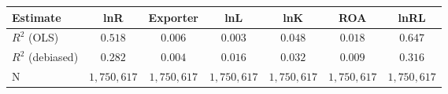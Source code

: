 \begin{tabular}{l*{6}{c}}
\hline\hline
 Estimate & lnR & Exporter & lnL & lnK & ROA & lnRL \\
\hline
\addlinespace $ R^2$ (OLS) & $0.518$ & $0.006$ & $0.003$ & $0.048$ & $0.018$ & $0.647$ \\
$ R^2$ (debiased) & $0.282$ & $0.004$ & $0.016$ & $0.032$ & $0.009$ & $0.316$ \\
N & $1,750,617$ & $1,750,617$ & $1,750,617$ & $1,750,617$ & $1,750,617$ & $1,750,617$ \\
\hline\hline
\end{tabular}

